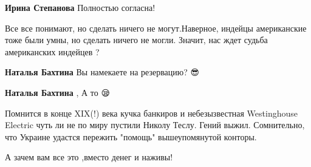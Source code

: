 \begin{itemize}
\begin{itemize}
\textbf{Ирина Степанова} Полностью согласна!
\end{itemize}

 

Все все понимают, но сделать ничего не могут.Наверное, индейцы американские
тоже были умны, но сделать ничего не могли. Значит, нас ждет судьба
американских индейцев ?

\begin{itemize}
 
\textbf{Наталья Бахтина}
Вы намекаете на резервацию? 😎

 
\textbf{Наталья Бахтина} , А то 😪
\end{itemize}

 

Помнится в конце XIX(!) века кучка банкиров и небезызвестная Westinghouse
Electric чуть ли не по миру пустили Николу Теслу. Гений выжил. Сомнительно, что
Украине удастся пережить "помощь" вышеупомянутой конторы.


 
А зачем вам все это ,вместо денег и наживы!

 

\end{itemize}
